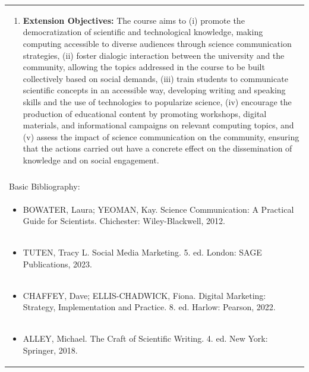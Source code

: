 \documentclass[11pt]{article}
\begin{document}
\begin{center}
\begin{longtable}{|p{4cm}|p{4cm}|p{4cm}|p{4cm}|}
\multicolumn{4}{|p{\dimexpr 16cm + 6\tabcolsep\relax}|}{\begin{enumerate}[start=7]\item \textbf{Extension Objectives:} The course aims to (i) promote the democratization of scientific and technological knowledge, making computing accessible to diverse audiences through science communication strategies, (ii) foster dialogic interaction between the university and the community, allowing the topics addressed in the course to be built collectively based on social demands, (iii) train students to communicate scientific concepts in an accessible way, developing writing and speaking skills and the use of technologies to popularize science, (iv) encourage the production of educational content by promoting workshops, digital materials, and informational campaigns on relevant computing topics, and (v) assess the impact of science communication on the community, ensuring that the actions carried out have a concrete effect on the dissemination of knowledge and on social engagement.\end{enumerate}}\\
\multicolumn{4}{|p{\dimexpr 16cm + 6\tabcolsep\relax}|}{}\\
\hline
\multicolumn{4}{|p{16cm}|}{Basic Bibliography:}\\*
\multicolumn{4}{|p{\dimexpr 16cm + 6\tabcolsep\relax}|}{\begin{itemize}\item BOWATER, Laura; YEOMAN, Kay. Science Communication: A Practical Guide for Scientists. Chichester: Wiley-Blackwell, 2012.\end{itemize}}\\
\multicolumn{4}{|p{\dimexpr 16cm + 6\tabcolsep\relax}|}{\begin{itemize}\item TUTEN, Tracy L. Social Media Marketing. 5. ed. London: SAGE Publications, 2023.\end{itemize}}\\
\multicolumn{4}{|p{\dimexpr 16cm + 6\tabcolsep\relax}|}{\begin{itemize}\item CHAFFEY, Dave; ELLIS-CHADWICK, Fiona. Digital Marketing: Strategy, Implementation and Practice. 8. ed. Harlow: Pearson, 2022.\end{itemize}}\\
\multicolumn{4}{|p{\dimexpr 16cm + 6\tabcolsep\relax}|}{\begin{itemize}\item ALLEY, Michael. The Craft of Scientific Writing. 4. ed. New York: Springer, 2018.\end{itemize}}\\

\end{longtable}
\end{center}
\end{document}
